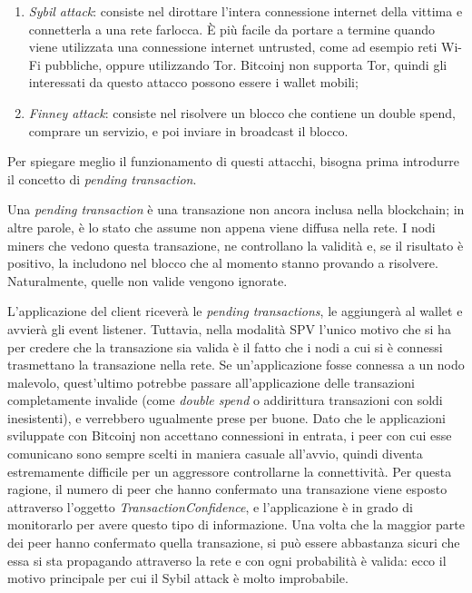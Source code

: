 \begin{enumerate}
    \item \textit{Sybil attack}: consiste nel dirottare l'intera connessione internet della vittima e connetterla a una rete farlocca. È più facile da portare a termine quando viene utilizzata una connessione internet untrusted, come ad esempio reti Wi-Fi pubbliche, oppure utilizzando Tor. Bitcoinj non supporta Tor, quindi gli interessati da questo attacco possono essere i wallet mobili; 
    \item \textit{Finney attack}: consiste nel risolvere un blocco che contiene un double spend, comprare un servizio, e poi inviare in broadcast il blocco.
\end{enumerate}

Per spiegare meglio il funzionamento di questi attacchi, bisogna prima introdurre il concetto di \textit{pending transaction}.

Una \textit{pending transaction} è una transazione non ancora inclusa nella blockchain; in altre parole, è lo stato che assume non appena viene diffusa nella rete. I nodi miners che vedono questa transazione, ne controllano la validità e, se il risultato è positivo, la includono nel blocco che al momento stanno provando a risolvere. Naturalmente, quelle non valide vengono ignorate.

L'applicazione del client riceverà le \textit{pending transactions}, le aggiungerà al wallet e avvierà gli event listener. Tuttavia, nella modalità SPV l'unico motivo che si ha per credere che la transazione sia valida è il fatto che i nodi a cui si è connessi trasmettano la transazione nella rete. Se un'applicazione fosse connessa a un nodo malevolo, quest'ultimo potrebbe passare all'applicazione delle transazioni completamente invalide (come \textit{double spend} o addirittura transazioni con soldi inesistenti), e verrebbero ugualmente prese per buone. 
Dato che le applicazioni sviluppate con Bitcoinj non accettano connessioni in entrata, i peer con cui esse comunicano sono sempre scelti in maniera casuale all'avvio, quindi diventa estremamente difficile per un aggressore controllarne la connettività. Per questa ragione, il numero di peer che hanno confermato una transazione viene esposto attraverso l'oggetto \textit{TransactionConfidence}, e l'applicazione è in grado di monitorarlo per avere questo tipo di informazione. 
Una volta che la maggior parte dei peer hanno confermato quella transazione, si può essere abbastanza sicuri che essa si sta propagando attraverso la rete e con ogni probabilità è valida: ecco il motivo principale per cui il Sybil attack è molto improbabile.

